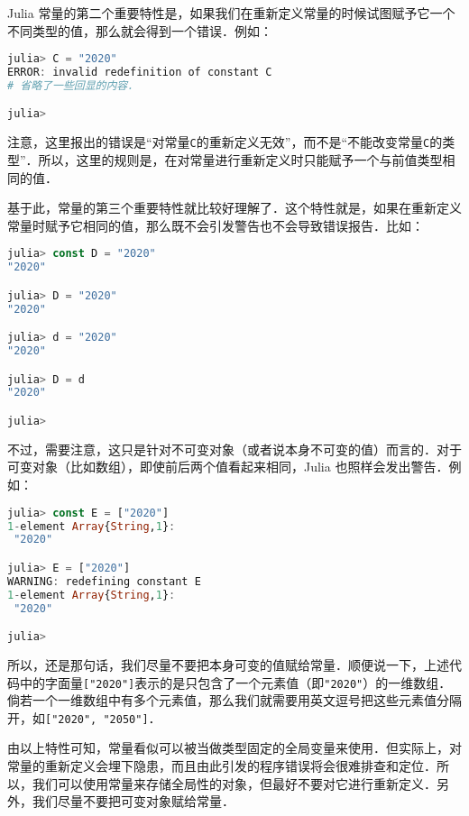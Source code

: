 Julia 常量的第二个重要特性是，如果我们在重新定义常量的时候试图赋予它一个不同类型的值，那么就会得到一个错误．例如：

\begin{lstlisting}[language=julia]
julia> C = "2020"
ERROR: invalid redefinition of constant C
# 省略了一些回显的内容．

julia> 
\end{lstlisting}

注意，这里报出的错误是“对常量\verb|C|的重新定义无效”，而不是“不能改变常量\verb|C|的类型”．所以，这里的规则是，在对常量进行重新定义时只能赋予一个与前值类型相同的值．

基于此，常量的第三个重要特性就比较好理解了．这个特性就是，如果在重新定义常量时赋予它相同的值，那么既不会引发警告也不会导致错误报告．比如：

\begin{lstlisting}[language=julia]
julia> const D = "2020"
"2020"

julia> D = "2020"
"2020"

julia> d = "2020"
"2020"

julia> D = d
"2020"

julia> 
\end{lstlisting}

不过，需要注意，这只是针对不可变对象（或者说本身不可变的值）而言的．对于可变对象（比如数组），即使前后两个值看起来相同，Julia 也照样会发出警告．例如：

\begin{lstlisting}[language=julia]
julia> const E = ["2020"]
1-element Array{String,1}:
 "2020"

julia> E = ["2020"]
WARNING: redefining constant E
1-element Array{String,1}:
 "2020"

julia> 
\end{lstlisting}

所以，还是那句话，我们尽量不要把本身可变的值赋给常量．顺便说一下，上述代码中的字面量\verb|["2020"]|表示的是只包含了一个元素值（即\verb|"2020"|）的一维数组．倘若一个一维数组中有多个元素值，那么我们就需要用英文逗号把这些元素值分隔开，如\verb|["2020", "2050"]|．

由以上特性可知，常量看似可以被当做类型固定的全局变量来使用．但实际上，对常量的重新定义会埋下隐患，而且由此引发的程序错误将会很难排查和定位．所以，我们可以使用常量来存储全局性的对象，但最好不要对它进行重新定义．另外，我们尽量不要把可变对象赋给常量．